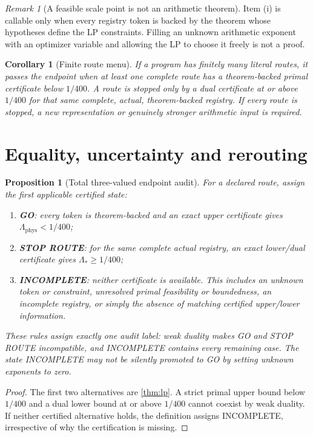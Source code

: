 \documentclass[11pt]{article}
\newtheorem{proposition}[theorem]{Proposition}
\newtheorem{corollary}[theorem]{Corollary}
\theoremstyle{definition}
\theoremstyle{remark}
\newtheorem{remark}[theorem]{Remark}
\newcommand{\Lam}{\Lambda_{\mathrm{phys}}}
\begin{document}
\begin{remark}[A feasible scale point is not an arithmetic theorem]
Item (i) is callable only when every registry token is backed by the
theorem whose hypotheses define the LP constraints.  Filling an
unknown arithmetic exponent with an optimizer variable and allowing
the LP to choose it freely is not a proof.
\end{remark}

\begin{corollary}[Finite route menu]
If a program has finitely many literal routes, it passes the endpoint
when at least one complete route has a theorem-backed primal
certificate below \(1/400\).  A route is stopped only by a dual
certificate at or above \(1/400\) for that same complete, actual,
theorem-backed registry.  If every route is stopped, a new
representation or genuinely stronger arithmetic input is required.
\end{corollary}

\section{Equality, uncertainty and rerouting}

\begin{proposition}[Total three-valued endpoint audit]
\label{prop:logic}
For a declared route, assign the first applicable certified state:
\begin{enumerate}[label=(\roman*),leftmargin=2em]
\item \textbf{GO}: every token is theorem-backed and an exact upper
  certificate gives \(\Lam<1/400\);
\item \textbf{STOP ROUTE}: for the same complete actual registry, an
  exact lower/dual certificate gives \(\Lambda_*\ge1/400\);
\item \textbf{INCOMPLETE}: neither certificate is available.  This
  includes an unknown token or constraint, unresolved primal
  feasibility or boundedness, an incomplete registry, or simply the
  absence of matching certified upper/lower information.
\end{enumerate}
These rules assign exactly one audit label: weak duality makes GO and
STOP ROUTE incompatible, and INCOMPLETE contains every remaining
case.
The state INCOMPLETE may not be silently promoted to GO by setting
unknown exponents to zero.
\end{proposition}

\begin{proof}
The first two alternatives are \cref{thm:lp}.  A strict primal upper
bound below \(1/400\) and a dual lower bound at or above \(1/400\)
cannot coexist by weak duality.  If neither certified alternative
holds, the definition assigns INCOMPLETE, irrespective of why the
certification is missing.
\end{proof}
\end{document}
